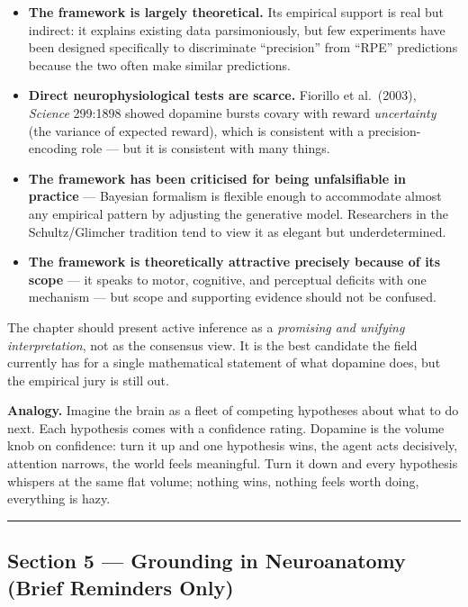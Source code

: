 \begin{itemize}
\tightlist
\item
  \textbf{The framework is largely theoretical.} Its empirical support is real but indirect: it explains existing data parsimoniously, but few experiments have been designed specifically to discriminate ``precision'' from ``RPE'' predictions because the two often make similar predictions.
\item
  \textbf{Direct neurophysiological tests are scarce.} Fiorillo et al.~(2003), \emph{Science} 299:1898 showed dopamine bursts covary with reward \emph{uncertainty} (the variance of expected reward), which is consistent with a precision-encoding role --- but it is consistent with many things.
\item
  \textbf{The framework has been criticised for being unfalsifiable in practice} --- Bayesian formalism is flexible enough to accommodate almost any empirical pattern by adjusting the generative model. Researchers in the Schultz/Glimcher tradition tend to view it as elegant but underdetermined.
\item
  \textbf{The framework is theoretically attractive precisely because of its scope} --- it speaks to motor, cognitive, and perceptual deficits with one mechanism --- but scope and supporting evidence should not be confused.
\end{itemize}

The chapter should present active inference as a \emph{promising and unifying interpretation}, not as the consensus view. It is the best candidate the field currently has for a single mathematical statement of what dopamine does, but the empirical jury is still out.

\textbf{Analogy.} Imagine the brain as a fleet of competing hypotheses about what to do next. Each hypothesis comes with a confidence rating. Dopamine is the volume knob on confidence: turn it up and one hypothesis wins, the agent acts decisively, attention narrows, the world feels meaningful. Turn it down and every hypothesis whispers at the same flat volume; nothing wins, nothing feels worth doing, everything is hazy.

\begin{center}\rule{0.5\linewidth}{0.5pt}\end{center}

\subsection{Section 5 --- Grounding in Neuroanatomy (Brief Reminders Only)}\label{01_dopamine_substrate-section-5-grounding-in-neuroanatomy-brief-reminders-only}

